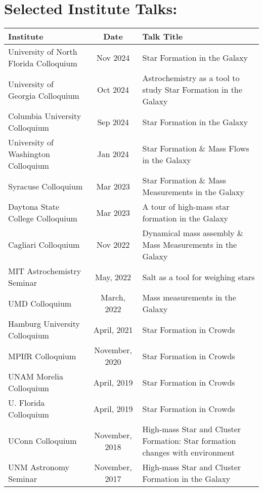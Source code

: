 
\begin{minipage}{\textwidth}
\setlength{\extrarowheight}{4pt}
\section*{Selected Institute Talks:}
\vspace{-12pt}
\begin{tabular}{p{1.8in}cp{3.5in}}
    Institute & Date & Talk Title \\
                \hline
    University of North Florida Colloquium & Nov 2024 & Star Formation in the Galaxy \\
    University of Georgia Colloquium & Oct 2024 & Astrochemistry as a tool to study Star Formation in the Galaxy \\
    Columbia University Colloquium & Sep 2024 & Star Formation in the Galaxy \\
    University of Washington Colloquium & Jan 2024 & Star Formation \& Mass Flows in the Galaxy \\
    Syracuse Colloquium & Mar 2023 & Star Formation \& Mass Measurements in the Galaxy \\
    Daytona State College Colloquium & Mar 2023 & A tour of high-mass star formation in the Galaxy \\
    Cagliari Colloquium & Nov 2022 & Dynamical mass assembly \& Mass Measurements in the Galaxy \\
    MIT Astrochemistry Seminar & May, 2022 & Salt as a tool for weighing stars \\
    UMD Colloquium & March, 2022 & Mass measurements in the Galaxy \\
    Hamburg University Colloquium & April, 2021 & Star Formation in Crowds \\
    MPIfR Colloquium & November, 2020 & Star Formation in Crowds \\
    UNAM Morelia Colloquium & April, 2019 & Star Formation in Crowds \\
    U. Florida Colloquium & April, 2019 & Star Formation in Crowds \\
    UConn Colloquium & November, 2018 & High-mass Star and Cluster Formation: Star formation changes with environment \\
    UNM Astronomy Seminar & November, 2017 & High-mass Star and Cluster Formation in the Galaxy \\

\end{tabular}
\end{minipage}
